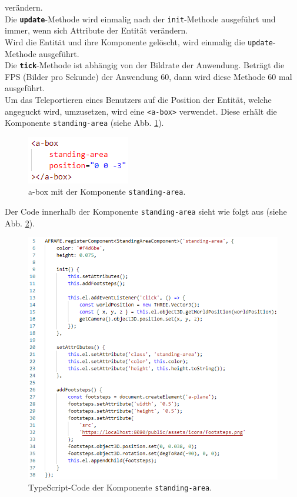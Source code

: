 \documentclass[a4paper,12pt,oneside]{article}
\begin{document}
        verändern. \\
        Die \texttt{\textbf{update}}-Methode wird einmalig nach der
        \texttt{init}-Methode ausgeführt und immer, wenn sich Attribute
        der Entität verändern. \\
        Wird die Entität und ihre Komponente gelöscht, wird einmalig
        die \texttt{update}-Methode ausgeführt. \\
        Die \texttt{\textbf{tick}}-Methode ist abhängig von der Bildrate der
        Anwendung. Beträgt die FPS (Bilder pro
        Sekunde) der Anwendung 60, dann wird diese Methode 60 mal ausgeführt. \\
        Um das Teleportieren eines Benutzers auf die Position der Entität, 
        welche angeguckt wird, umzusetzen, wird eine \texttt{<a-box>}
        verwendet. Diese erhält die Komponente \texttt{standing-area}
        (siehe Abb. \ref{fig:standing-area1}).
        \begin{figure}[h]
          \centering
          \includegraphics{img/coding/standing-area1.png}
          \caption{a-box mit der Komponente \texttt{standing-area}.}
          \label{fig:standing-area1}
        \end{figure}
        Der Code innerhalb der Komponente \texttt{standing-area} sieht
        wie folgt aus (siehe Abb. \ref{fig:standing-area2}).
        \begin{figure}[h]
          \centering
          \includegraphics{img/coding/standing-area2.png}
          \caption{TypeScript-Code der Komponente \texttt{standing-area}.}
          \label{fig:standing-area2}
        \end{figure}
\end{document}
